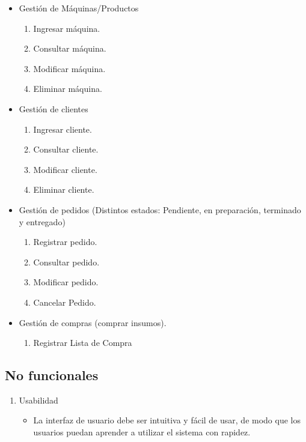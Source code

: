 \documentclass{article}
\begin{document}
\begin{itemize}
	\item Gestión de Máquinas/Productos
	\begin{enumerate}[start=12]
		\item Ingresar máquina.
		\item Consultar máquina.
		\item Modificar máquina.
		\item Eliminar máquina.
	\end{enumerate}
\end{itemize}

\begin{itemize}
	\item Gestión de clientes
	\begin{enumerate}[start=16]
		\item Ingresar cliente.
		\item Consultar cliente.
		\item Modificar cliente.
		\item Eliminar cliente.
	\end{enumerate}
\end{itemize}

\begin{itemize}
	\item Gestión de pedidos (Distintos estados: Pendiente, en preparación, terminado y entregado)
	\begin{enumerate}[start=20]
		\item Registrar pedido.
		\item Consultar pedido.
		\item Modificar pedido.
		\item Cancelar Pedido.
	\end{enumerate}
\end{itemize}

\begin{itemize}
	\item Gestión de compras (comprar insumos).
	\begin{enumerate}[start=24]
		\item Registrar Lista de Compra
	\end{enumerate}
\end{itemize}

\subsection{No funcionales}
\begin{enumerate}
	\item Usabilidad
	\begin{itemize}
		\item La interfaz de usuario debe ser intuitiva y fácil de usar, de modo que los usuarios puedan aprender a utilizar el sistema con rapidez.
	\end{itemize}
\end{enumerate}
\end{document}
